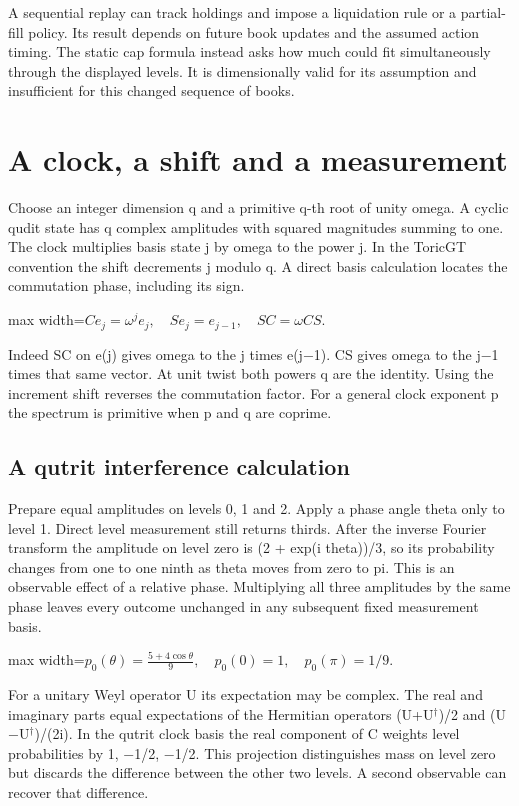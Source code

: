 \documentclass[11pt,oneside,openany]{book}
\begin{document}
A sequential replay can track holdings and impose a liquidation rule or a partial-fill policy. Its result depends on future book updates and the assumed action timing. The static cap formula instead asks how much could fit simultaneously through the displayed levels. It is dimensionally valid for its assumption and insufficient for this changed sequence of books.

\chapter{A clock, a shift and a measurement}
Choose an integer dimension q and a primitive q-th root of unity omega. A cyclic qudit state has q complex amplitudes with squared magnitudes summing to one. The clock multiplies basis state j by omega to the power j. In the ToricGT convention the shift decrements j modulo q. A direct basis calculation locates the commutation phase, including its sign.

\begin{center}\begin{adjustbox}{max width=\linewidth}$\displaystyle C e_j=\omega^j e_j,\quad S e_j=e_{j-1},\quad SC=\omega CS.$\end{adjustbox}\end{center}
Indeed SC on e(j) gives omega to the j times e(j\ensuremath{-}1). CS gives omega to the j\ensuremath{-}1 times that same vector. At unit twist both powers q are the identity. Using the increment shift reverses the commutation factor. For a general clock exponent p the spectrum is primitive when p and q are coprime.

\section*{A qutrit interference calculation}
Prepare equal amplitudes on levels 0, 1 and 2. Apply a phase angle theta only to level 1. Direct level measurement still returns thirds. After the inverse Fourier transform the amplitude on level zero is (2 + exp(i theta))/3, so its probability changes from one to one ninth as theta moves from zero to pi. This is an observable effect of a relative phase. Multiplying all three amplitudes by the same phase leaves every outcome unchanged in any subsequent fixed measurement basis.

\begin{center}\begin{adjustbox}{max width=\linewidth}$\displaystyle p_0(\theta)=\frac{5+4\cos\theta}{9},\quad p_0(0)=1,\quad p_0(\pi)=1/9.$\end{adjustbox}\end{center}
For a unitary Weyl operator U its expectation may be complex. The real and imaginary parts equal expectations of the Hermitian operators (U+U\ensuremath{^\dagger})/2 and (U\ensuremath{-}U\ensuremath{^\dagger})/(2i). In the qutrit clock basis the real component of C weights level probabilities by 1, \ensuremath{-}1/2, \ensuremath{-}1/2. This projection distinguishes mass on level zero but discards the difference between the other two levels. A second observable can recover that difference.
\end{document}
